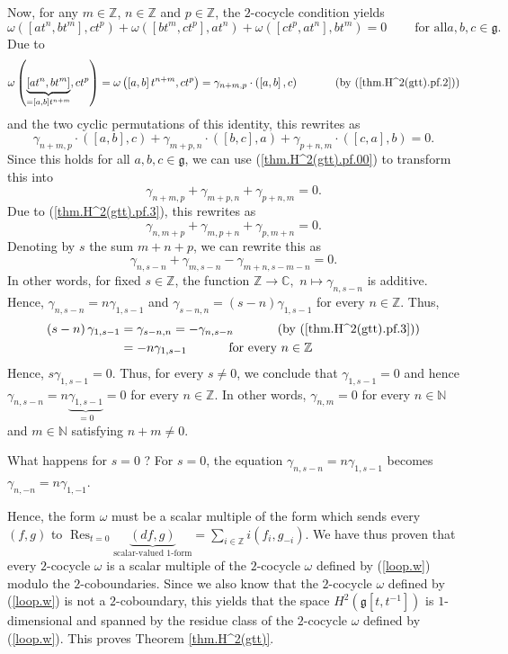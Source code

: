 \documentclass
[numbers=enddot,12pt,final,onecolumn,german,notitlepage]{scrartcl}%
\theoremstyle{definition}
\begin{document}
Now, for any $m\in\mathbb{Z}$, $n\in\mathbb{Z}$ and $p\in\mathbb{Z}$, the
$2$-cocycle condition yields%
\[
\omega\left(  \left[  at^{n},bt^{m}\right]  ,ct^{p}\right)  +\omega\left(
\left[  bt^{m},ct^{p}\right]  ,at^{n}\right)  +\omega\left(  \left[
ct^{p},at^{n}\right]  ,bt^{m}\right)  =0\ \ \ \ \ \ \ \ \ \ \text{for all
}a,b,c\in\mathfrak{g}.
\]
Due to%
\[
\omega\left(  \underbrace{\left[  at^{n},bt^{m}\right]  }_{=\left[
a,b\right]  t^{n+m}},ct^{p}\right)  =\omega\left(  \left[  a,b\right]
t^{n+m},ct^{p}\right)  =\gamma_{n+m,p}\cdot\left(  \left[  a,b\right]
,c\right)  \ \ \ \ \ \ \ \ \ \ \left(  \text{by (\ref{thm.H^2(gtt).pf.2}%
)}\right)
\]
and the two cyclic permutations of this identity, this rewrites as%
\[
\gamma_{n+m,p}\cdot\left(  \left[  a,b\right]  ,c\right)  +\gamma_{m+p,n}%
\cdot\left(  \left[  b,c\right]  ,a\right)  +\gamma_{p+n,m}\cdot\left(
\left[  c,a\right]  ,b\right)  =0.
\]
Since this holds for all $a,b,c\in\mathfrak{g}$, we can use
(\ref{thm.H^2(gtt).pf.00}) to transform this into%
\[
\gamma_{n+m,p}+\gamma_{m+p,n}+\gamma_{p+n,m}=0.
\]
Due to (\ref{thm.H^2(gtt).pf.3}), this rewrites as%
\[
\gamma_{n,m+p}+\gamma_{m,p+n}+\gamma_{p,m+n}=0.
\]
Denoting by $s$ the sum $m+n+p$, we can rewrite this as%
\[
\gamma_{n,s-n}+\gamma_{m,s-n}-\gamma_{m+n,s-m-n}=0.
\]
In other words, for fixed $s\in\mathbb{Z}$, the function $\mathbb{Z}%
\rightarrow\mathbb{C},$ $n\mapsto\gamma_{n,s-n}$ is additive. Hence,
$\gamma_{n,s-n}=n\gamma_{1,s-1}$ and $\gamma_{s-n,n}=\left(  s-n\right)
\gamma_{1,s-1}$ for every $n\in\mathbb{Z}$. Thus,
\begin{align*}
\left(  s-n\right)  \gamma_{1,s-1}  &  =\gamma_{s-n,n}=-\gamma_{n,s-n}%
\ \ \ \ \ \ \ \ \ \ \left(  \text{by (\ref{thm.H^2(gtt).pf.3})}\right) \\
&  =-n\gamma_{1,s-1}\ \ \ \ \ \ \ \ \ \ \text{for every }n\in\mathbb{Z}%
\end{align*}
Hence, $s\gamma_{1,s-1}=0$. Thus, for every $s\neq0$, we conclude that
$\gamma_{1,s-1}=0$ and hence $\gamma_{n,s-n}=n\underbrace{\gamma_{1,s-1}}%
_{=0}=0$ for every $n\in\mathbb{Z}$. In other words, $\gamma_{n,m}=0$ for
every $n\in\mathbb{N}$ and $m\in\mathbb{N}$ satisfying $n+m\neq0$.

What happens for $s=0$ ? For $s=0$, the equation $\gamma_{n,s-n}%
=n\gamma_{1,s-1}$ becomes $\gamma_{n,-n}=n\gamma_{1,-1}$.

Hence, the form $\omega$ must be a scalar multiple of the form which sends
every $\left(  f,g\right)  $ to $\operatorname*{Res}\nolimits_{t=0}%
\underbrace{\left(  df,g\right)  }_{\text{scalar-valued }1\text{-form}}%
=\sum\limits_{i\in\mathbb{Z}}i\left(  f_{i},g_{-i}\right)  $. We have thus
proven that every $2$-cocycle $\omega$ is a scalar multiple of the $2$-cocycle
$\omega$ defined by (\ref{loop.w}) modulo the $2$-coboundaries. Since we also
know that the $2$-cocycle $\omega$ defined by (\ref{loop.w}) is not a
$2$-coboundary, this yields that the space $H^{2}\left(  \mathfrak{g}\left[
t,t^{-1}\right]  \right)  $ is $1$-dimensional and spanned by the residue
class of the $2$-cocycle $\omega$ defined by (\ref{loop.w}). This proves
Theorem \ref{thm.H^2(gtt)}.
\end{document}
